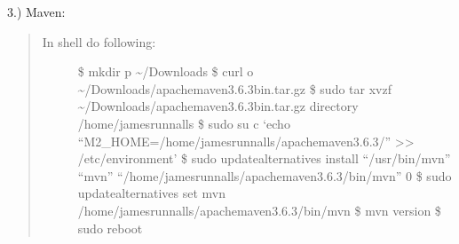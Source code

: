 \documentclass[letterpaper,10pt,english]{sphinxmanual}
\begin{document}
3.) Maven: 
\begin{quote}
\begin{description}
\item[{In shell do following:}] \leavevmode
\$ mkdir \sphinxhyphen{}p \textasciitilde{}/Downloads
\$ curl  \sphinxhyphen{}o \textasciitilde{}/Downloads/apache\sphinxhyphen{}maven\sphinxhyphen{}3.6.3\sphinxhyphen{}bin.tar.gz
\$ sudo tar \sphinxhyphen{}xvzf \textasciitilde{}/Downloads/apache\sphinxhyphen{}maven\sphinxhyphen{}3.6.3\sphinxhyphen{}bin.tar.gz \textendash{}directory /home/jamesrunnalls
\$ sudo su \sphinxhyphen{}c ‘echo “M2\_HOME=/home/jamesrunnalls/apache\sphinxhyphen{}maven\sphinxhyphen{}3.6.3/” \textgreater{}\textgreater{} /etc/environment’
\$ sudo update\sphinxhyphen{}alternatives \textendash{}install “/usr/bin/mvn” “mvn” “/home/jamesrunnalls/apache\sphinxhyphen{}maven\sphinxhyphen{}3.6.3/bin/mvn” 0
\$ sudo update\sphinxhyphen{}alternatives \textendash{}set mvn /home/jamesrunnalls/apache\sphinxhyphen{}maven\sphinxhyphen{}3.6.3/bin/mvn
\$ mvn \sphinxhyphen{}version
\$ sudo reboot

\end{description}
\end{quote}
\end{document}
